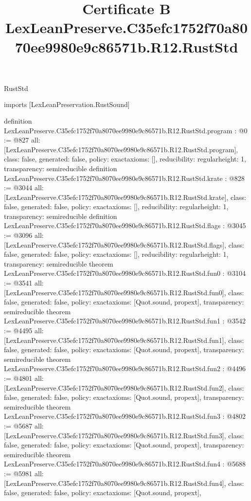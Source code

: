 \begin{lexlean}{RustStd}
\title{Certificate B LexLeanPreserve.C35efc1752f70a8070ee9980e9c86571b.R12.RustStd}
\begin{coremodule}
imports [LexLeanPreservation.RustSound]

definition LexLeanPreserve.C35efc1752f70a8070ee9980e9c86571b.R12.RustStd.program : @0 := @827 {
  all: [LexLeanPreserve.C35efc1752f70a8070ee9980e9c86571b.R12.RustStd.program],
  class: false,
  generated: false,
  policy: exact{axioms: []},
  reducibility: regular{height: 1},
  transparency: semireducible
}
definition LexLeanPreserve.C35efc1752f70a8070ee9980e9c86571b.R12.RustStd.krate : @828 := @3044 {
  all: [LexLeanPreserve.C35efc1752f70a8070ee9980e9c86571b.R12.RustStd.krate],
  class: false,
  generated: false,
  policy: exact{axioms: []},
  reducibility: regular{height: 1},
  transparency: semireducible
}
definition LexLeanPreserve.C35efc1752f70a8070ee9980e9c86571b.R12.RustStd.flags : @3045 := @3096 {
  all: [LexLeanPreserve.C35efc1752f70a8070ee9980e9c86571b.R12.RustStd.flags],
  class: false,
  generated: false,
  policy: exact{axioms: []},
  reducibility: regular{height: 1},
  transparency: semireducible
}
theorem LexLeanPreserve.C35efc1752f70a8070ee9980e9c86571b.R12.RustStd.fun0 : @3104 := @3541 {
  all: [LexLeanPreserve.C35efc1752f70a8070ee9980e9c86571b.R12.RustStd.fun0],
  class: false,
  generated: false,
  policy: exact{axioms: [Quot.sound, propext]},
  transparency: semireducible
}
theorem LexLeanPreserve.C35efc1752f70a8070ee9980e9c86571b.R12.RustStd.fun1 : @3542 := @4495 {
  all: [LexLeanPreserve.C35efc1752f70a8070ee9980e9c86571b.R12.RustStd.fun1],
  class: false,
  generated: false,
  policy: exact{axioms: [Quot.sound, propext]},
  transparency: semireducible
}
theorem LexLeanPreserve.C35efc1752f70a8070ee9980e9c86571b.R12.RustStd.fun2 : @4496 := @4801 {
  all: [LexLeanPreserve.C35efc1752f70a8070ee9980e9c86571b.R12.RustStd.fun2],
  class: false,
  generated: false,
  policy: exact{axioms: [Quot.sound, propext]},
  transparency: semireducible
}
theorem LexLeanPreserve.C35efc1752f70a8070ee9980e9c86571b.R12.RustStd.fun3 : @4802 := @5687 {
  all: [LexLeanPreserve.C35efc1752f70a8070ee9980e9c86571b.R12.RustStd.fun3],
  class: false,
  generated: false,
  policy: exact{axioms: [Quot.sound, propext]},
  transparency: semireducible
}
theorem LexLeanPreserve.C35efc1752f70a8070ee9980e9c86571b.R12.RustStd.fun4 : @5688 := @5981 {
  all: [LexLeanPreserve.C35efc1752f70a8070ee9980e9c86571b.R12.RustStd.fun4],
  class: false,
  generated: false,
  policy: exact{axioms: [Quot.sound, propext]},
}
\end{coremodule}
\end{lexlean}
